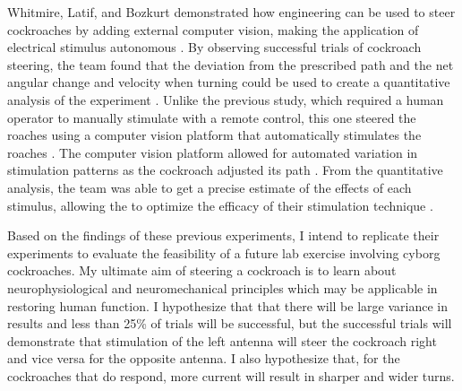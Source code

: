 \bigskip

Whitmire, Latif, and Bozkurt demonstrated how engineering can be used to steer cockroaches by adding external computer vision, making the application of electrical stimulus autonomous \citep{whitmire2013kinect}. By observing successful trials of cockroach steering, the team found that the deviation from the prescribed path and the net angular change and velocity when turning could be used to create a quantitative analysis of the experiment \citep{whitmire2013kinect}. Unlike the previous study, which required a human operator to manually stimulate with a remote control, this one steered the roaches using a computer vision platform that automatically stimulates the roaches \citep{whitmire2013kinect}. The computer vision platform allowed for automated variation in stimulation patterns as the cockroach adjusted its path \citep{whitmire2013kinect}. From the quantitative analysis, the team was able to get a precise estimate of the effects of each stimulus, allowing the to optimize the efficacy of their stimulation technique \citep{whitmire2013kinect}. 

\bigskip


Based on the findings of these previous experiments, I intend to replicate their experiments to evaluate the feasibility of a future lab exercise involving cyborg cockroaches. My ultimate aim of steering a cockroach is to learn about neurophysiological and neuromechanical principles which may be applicable in restoring human function. I hypothesize that that there will be large variance in results and less than 25\% of trials will be successful, but the successful trials will demonstrate that stimulation of the left antenna will steer the cockroach right and vice versa for the opposite antenna. I also hypothesize that, for the cockroaches that do respond, more current will result in sharper and wider turns.







